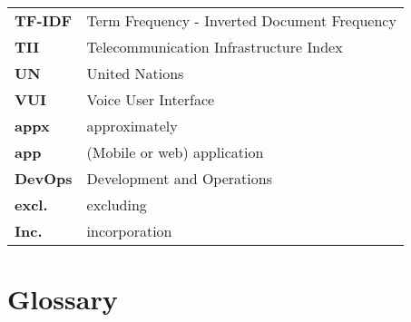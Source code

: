 \begin{flushleft}
\begin{tabular}{ll}
\textbf{TF-IDF}	&	Term Frequency - Inverted Document Frequency\\
\textbf{TII}	&	Telecommunication Infrastructure Index\\

\textbf{UN}		&	United Nations\\

\textbf{VUI}	&	Voice User Interface\\




\hline

\textbf{appx}	&	approximately\\
\textbf{app}	&	(Mobile or web) application\\
\textbf{DevOps}	&	Development and Operations\\
\textbf{excl.}	& 	excluding\\
\textbf{Inc.}	&	incorporation\\



\end{tabular}
\end{flushleft}

\newpage
\section*{Glossary}
%

